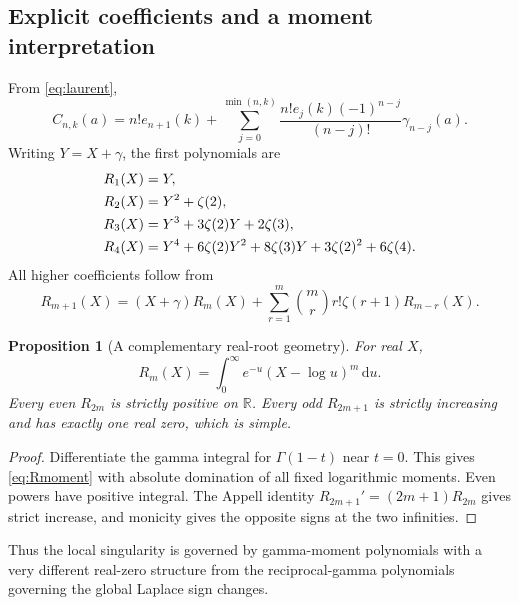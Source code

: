 \documentclass[11pt]{article}
\numberwithin{equation}{section}
\newtheorem{proposition}[theorem]{Proposition}
\theoremstyle{definition}\newtheorem{definition}[theorem]{Definition}
\theoremstyle{remark}\newtheorem{remark}[theorem]{Remark}
\newcommand{\R}{\mathbb R}\newcommand{\C}{\mathbb C}
\newcommand{\dd}{\,\mathrm d}
\begin{document}
\subsection{Explicit coefficients and a moment interpretation}
From \eqref{eq:laurent},
\begin{equation}\label{eq:Cexplicit}
C_{n,k}(a)=n!e_{n+1}(k)
+\sum_{j=0}^{\min(n,k)}\frac{n!e_j(k)(-1)^{n-j}}{(n-j)!}\gamma_{n-j}(a).
\end{equation}
Writing $Y=X+\gamma$, the first polynomials are
\begin{align}
R_1(X)&=Y,\notag\\
R_2(X)&=Y^2+\zeta(2),\notag\\
R_3(X)&=Y^3+3\zeta(2)Y+2\zeta(3),\label{eq:Rexamples}\\
R_4(X)&=Y^4+6\zeta(2)Y^2+8\zeta(3)Y+3\zeta(2)^2+6\zeta(4).\notag
\end{align}
All higher coefficients follow from
\begin{equation}\label{eq:Rrec}
R_{m+1}(X)=(X+\gamma)R_m(X)
+\sum_{r=1}^m\binom mr r!\zeta(r+1)R_{m-r}(X).
\end{equation}

\begin{proposition}[A complementary real-root geometry]\label{prop:Rmoment}
For real $X$,
\begin{equation}\label{eq:Rmoment}
R_m(X)=\int_0^\infty e^{-u}(X-\log u)^m\dd u.
\end{equation}
Every even $R_{2m}$ is strictly positive on $\R$. Every odd $R_{2m+1}$ is strictly increasing and has exactly one real zero, which is simple.
\end{proposition}
\begin{proof}
Differentiate the gamma integral for $\Gamma(1-t)$ near $t=0$. This gives \eqref{eq:Rmoment} with absolute domination of all fixed logarithmic moments. Even powers have positive integral. The Appell identity $R_{2m+1}'=(2m+1)R_{2m}$ gives strict increase, and monicity gives the opposite signs at the two infinities.
\end{proof}
Thus the local singularity is governed by gamma-moment polynomials with a very different real-zero structure from the reciprocal-gamma polynomials governing the global Laplace sign changes.
\end{document}

